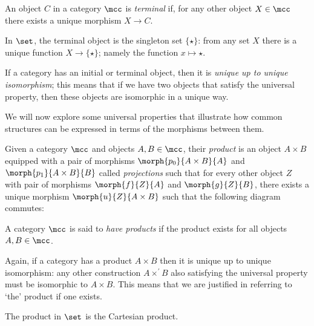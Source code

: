 \begin{definition}
    An object \(C\) in a category \(\mcc\) is \emph{terminal} if, for any other
    object \(X \in \mcc\) there exists a unique morphism \(X \to C\).
\end{definition}

\begin{example}
    In \(\set\), the terminal object is the singleton set \(\{\star\}\):
    from any set \(X\) there is a unique function \(X \to \{\star\}\); namely
    the function \(x \mapsto \star\).
\end{example}

If a category has an initial or terminal object, then it is
\emph{unique up to unique isomorphism}; this means that if we have two objects
that satisfy the universal property, then these objects are isomorphic in a
unique way.

We will now explore some universal properties that illustrate how common
structures can be expressed in terms of the morphisms between them.

\begin{definition}[Product]\label{def:product}
    Given a category \(\mcc\) and objects \(A,B \in \mcc\), their \emph{product}
    is an object \(A \times B\) equipped with a pair of morphisms
    \(\morph{p_0}{A \times B}{A}\) and \(\morph{p_1}{A \times B}{B}\) called
    \emph{projections} such that for every other object \(Z\) with pair of
    morphisms \(\morph{f}{Z}{A}\) and \(\morph{g}{Z}{B}\), there exists a unique
    morphism \(\morph{u}{Z}{A \times B}\) such that the following diagram
    commutes:
    \begin{center}
        
    \end{center}
    A category \(\mcc\) is said to \emph{have products} if the product exists
    for all objects \(A,B \in \mcc\).
\end{definition}

Again, if a category has a product \(A \times B\) then it is unique up to unique
isomorphism: any other construction \(A \times^\prime B\) also satisfying the
universal property must be isomorphic to \(A \times B\).
This means that we are justified in referring to `the' product if one exists.

\begin{example}
    The product in \(\set\) is the Cartesian product.
\end{example}

